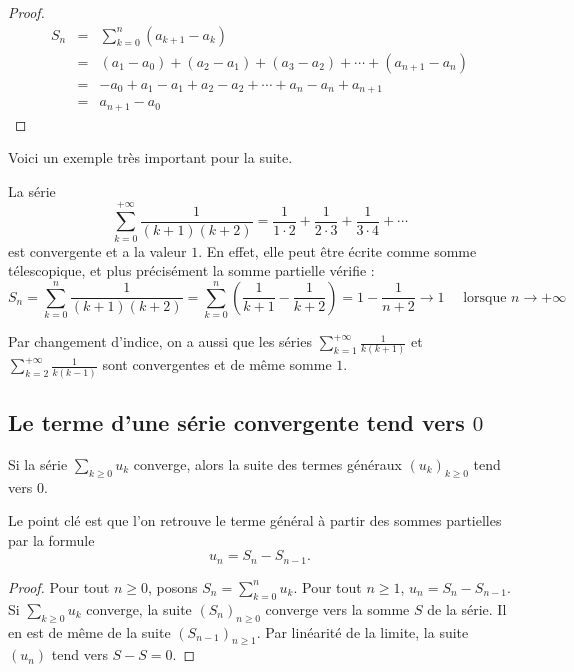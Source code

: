 \documentclass[class=report,crop=false]{standalone}
\begin{document}
\begin{proof}
\begin{eqnarray*}
S_n
&=& \sum_{k=0}^n (a_{k+1}-a_k)\\
&=& (a_1-a_0)+(a_2-a_1)+(a_3-a_2) +\cdots +(a_{n+1}-a_n)\\
&=& -a_0 +a_1-a_1+a_2-a_2+ \cdots +a_n-a_n+a_{n+1}\\
&=& a_{n+1}-a_0 
\end{eqnarray*}
\end{proof}


Voici un exemple très important pour la suite.
\begin{exemple}
\label{ex:seriek2}
La série $$\sum_{k=0}^{+\infty} \frac{1}{(k+1)(k+2)}=\frac{1}{1\cdot 2}+\frac{1}{2\cdot 3}+
 \frac{1}{3\cdot 4}+\cdots$$
est convergente et a la valeur $1$. 
En effet, elle peut être écrite comme somme télescopique, et plus précisément la somme partielle vérifie :
$$S_n=\sum_{k=0}^n \frac{1}{(k+1)(k+2)}= \sum_{k=0}^n \left(\frac{1}{k+1}-\frac{1}{k+2}\right)
= 1 - \frac{1}{n+2} \to 1 \quad \text{ lorsque } n\to+\infty$$

Par changement d'indice, on a aussi que les séries 
$\sum_{k=1}^{+\infty} \frac{1}{k(k+1)}$ et 
$\sum_{k=2}^{+\infty} \frac{1}{k(k-1)}$ sont convergentes et de même somme $1$.
\end{exemple}


\subsection{Le terme d'une série convergente tend vers $0$}


\begin{theoreme}
Si la série $\sum_{k\ge0} u_k$ converge, 
alors la suite des termes généraux $(u_k)_{k \ge 0}$ tend vers $0$.
\end{theoreme}

Le point clé est que l'on retrouve le terme général à partir des sommes partielles par la formule
$$u_n = S_n - S_{n-1}.$$

\begin{proof}
Pour tout $n \ge 0$, posons $S_n=\sum_{k=0}^{n} u_k$. Pour tout
$n \ge 1$, $u_n=S_n-S_{n-1}$. Si $\sum_{k\ge0} u_k$ converge, 
la suite $(S_n)_{n\ge0}$ converge vers la somme $S$ de la série. Il en
est de même de la suite $(S_{n-1})_{n \ge 1}$. Par linéarité de
la limite, la suite $(u_n)$ tend vers $S-S=0$.
\end{proof}
\end{document}
